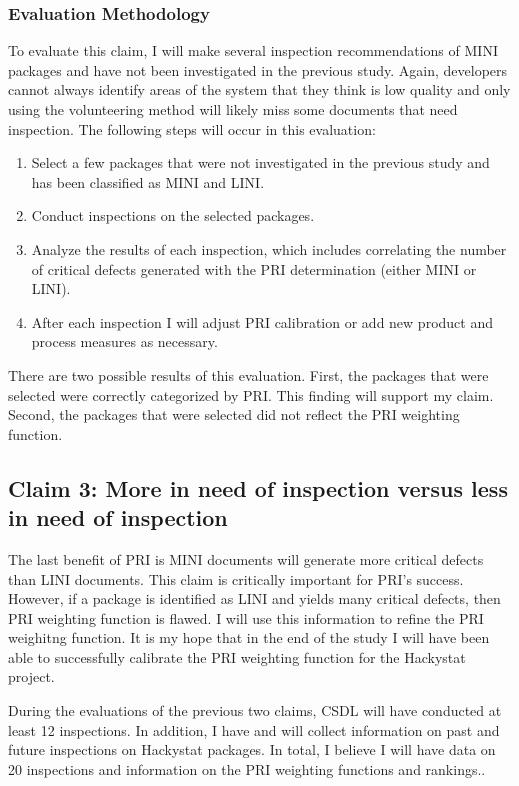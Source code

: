 \subsubsection{Evaluation Methodology}
To evaluate this claim, I will make several inspection recommendations of
MINI packages and have not been investigated in the previous study. Again,
developers cannot always identify areas of the system that they think is
low quality and only using the volunteering method will likely miss some
documents that need inspection. The following steps will occur in this
evaluation:

\begin{enumerate}
\item Select a few packages that were not investigated in the previous
  study and has been classified as MINI and LINI. 
\item Conduct inspections on the selected packages. 
\item Analyze the results of each inspection, which includes correlating
  the number of critical defects generated with the PRI determination
  (either MINI or LINI). 
\item After each inspection I will adjust PRI calibration or add new
  product and process measures as necessary.
\end{enumerate}

There are two possible results of this evaluation. First, the packages that
were selected were correctly categorized by PRI. This finding will support
my claim. Second, the packages that were selected did not reflect the PRI
weighting function.




\subsection{Claim 3: More in need of inspection versus less in need of inspection}
\label{sec:claim3}
The last benefit of PRI is MINI documents will generate more critical
defects than LINI documents. This claim is critically important for PRI's
success. However, if a package is identified as LINI and yields many
critical defects, then PRI weighting function is flawed. I will use this
information to refine the PRI weighitng function. It is my hope that in the
end of the study I will have been able to successfully calibrate the PRI
weighting function for the Hackystat project.

During the evaluations of the previous two claims, CSDL will have conducted
at least 12 inspections.  In addition, I have and will collect information
on past and future inspections on Hackystat packages. In total, I believe I
will have data on 20 inspections and information on the PRI weighting
functions and rankings..

